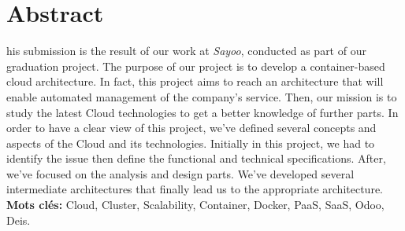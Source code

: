 
\chapter*{Abstract}

\begin{singlespace}
his submission is the result of our work at \emph{Sayoo}, conducted as part of our graduation project. The purpose of our project is to develop a container-based cloud architecture. 
\newline
\newline
In fact, this project aims to reach an architecture that will enable automated management of the company's service. Then, our mission is to study the latest Cloud technologies to get a better knowledge of further parts.
\noindent In order to have a clear view of this project, we've defined several concepts and aspects of the Cloud and its technologies.
\newline
\newline
Initially in this project, we had to identify the issue then define the functional and technical specifications. After, we've focused on the analysis and design parts. We've developed several intermediate architectures that finally lead us to the appropriate architecture.
\vfill{\textbf{Mots clés:} Cloud, Cluster, Scalability, Container, Docker, PaaS, SaaS, Odoo, Deis.}
\end{singlespace}